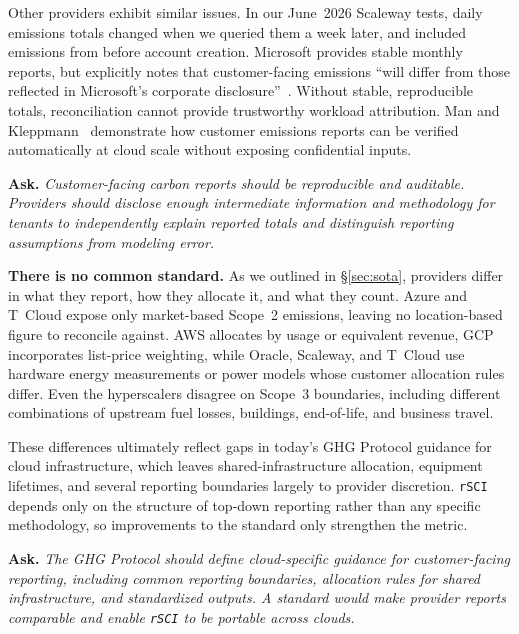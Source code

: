 \documentclass[sigconf]{acmart}
\newcommand{\parag}[1]{\vspace{2mm}\noindent\textbf{#1.}\hspace{2mm}}
\newcommand{\RSCI}{\texttt{rSCI}\xspace}
\newenvironment{callforaction}
  {\par\medskip\noindent\begin{lrbox}{\cfabox}%
   \begin{minipage}{\dimexpr\columnwidth-2\fboxsep-2\fboxrule\relax}%
   \textbf{Ask.}\hspace{1mm}\itshape}
  {\end{minipage}\end{lrbox}\noindent\fbox{\usebox{\cfabox}}\par\medskip}
\begin{document}
Other providers exhibit similar issues.
In our June~2026 Scaleway tests, daily emissions totals changed when we queried them a week later, and included emissions from before account creation.
Microsoft provides stable monthly reports, but explicitly notes that customer-facing emissions ``will differ from those reflected in Microsoft's corporate disclosure''~\cite{microsoft-s3-2021}.
Without stable, reproducible totals, reconciliation cannot provide trustworthy workload attribution.
Man and Kleppmann~\cite{man2026emissionimpossible} demonstrate how customer emissions reports can be verified automatically at cloud scale without exposing confidential inputs.

\begin{callforaction}
Customer-facing carbon reports should be reproducible and auditable.
Providers should disclose enough intermediate information and methodology for tenants to independently explain reported totals and distinguish reporting assumptions from modeling error.
\end{callforaction}

\parag{There is no common standard}
As we outlined in \S\ref{sec:sota}, providers differ in what they report, how they allocate it, and what they count.
Azure and T~Cloud expose only market-based Scope~2 emissions, leaving no location-based figure to reconcile against.
AWS allocates by usage or equivalent revenue, GCP incorporates list-price weighting, while Oracle, Scaleway, and T~Cloud use hardware energy measurements or power models whose customer allocation rules differ.
Even the hyperscalers disagree on Scope~3 boundaries, including different combinations of upstream fuel losses, buildings, end-of-life, and business travel.

These differences ultimately reflect gaps in today's GHG Protocol guidance for cloud infrastructure, which leaves shared-infra\-structure allocation, equipment lifetimes, and several reporting boundaries largely to provider discretion.
\RSCI depends only on the structure of top-down reporting rather than any specific methodology, so improvements to the standard only strengthen the metric.

\begin{callforaction}
The GHG Protocol should define cloud-specific guidance for customer-facing reporting, including common reporting boundaries, allocation rules for shared infrastructure, and standardized outputs.
A standard would make provider reports comparable and enable \RSCI to be portable across clouds.
\end{callforaction}
\end{document}
